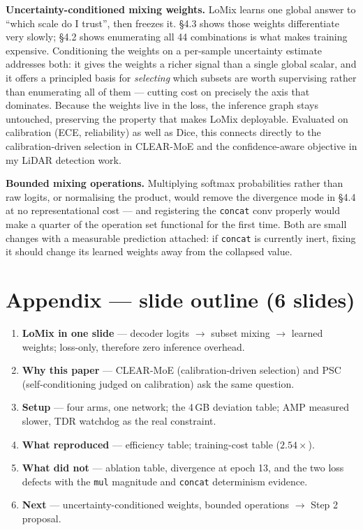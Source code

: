 \documentclass[11pt,a4paper]{article}
\newcommand{\code}[1]{\texttt{\small #1}}
\begin{document}
\textbf{Uncertainty-conditioned mixing weights.} LoMix learns one global answer
to ``which scale do I trust'', then freezes it. \S4.3 shows those weights
differentiate very slowly; \S4.2 shows enumerating all 44 combinations is what
makes training expensive. Conditioning the weights on a per-sample uncertainty
estimate addresses both: it gives the weights a richer signal than a single
global scalar, and it offers a principled basis for \emph{selecting} which
subsets are worth supervising rather than enumerating all of them --- cutting
cost on precisely the axis that dominates. Because the weights live in the loss,
the inference graph stays untouched, preserving the property that makes LoMix
deployable. Evaluated on calibration (ECE, reliability) as well as Dice, this
connects directly to the calibration-driven selection in CLEAR-MoE and the
confidence-aware objective in my LiDAR detection work.

\textbf{Bounded mixing operations.} Multiplying softmax probabilities rather
than raw logits, or normalising the product, would remove the divergence mode in
\S4.4 at no representational cost --- and registering the \code{concat} conv
properly would make a quarter of the operation set functional for the first
time. Both are small changes with a measurable prediction attached: if
\code{concat} is currently inert, fixing it should change its learned weights
away from the collapsed value.

\appendix
\section*{Appendix --- slide outline (6 slides)}

\begin{enumerate}
\item \textbf{LoMix in one slide} --- decoder logits $\rightarrow$ subset mixing
$\rightarrow$ learned weights; loss-only, therefore zero inference overhead.
\item \textbf{Why this paper} --- CLEAR-MoE (calibration-driven selection) and
PSC (self-conditioning judged on calibration) ask the same question.
\item \textbf{Setup} --- four arms, one network; the 4\,GB deviation table; AMP
measured slower, TDR watchdog as the real constraint.
\item \textbf{What reproduced} --- efficiency table; training-cost table
($2.54\times$).
\item \textbf{What did not} --- ablation table, divergence at epoch 13, and the
two loss defects with the \code{mul} magnitude and \code{concat} determinism
evidence.
\item \textbf{Next} --- uncertainty-conditioned weights, bounded operations
$\rightarrow$ Step 2 proposal.
\end{enumerate}
\end{document}
